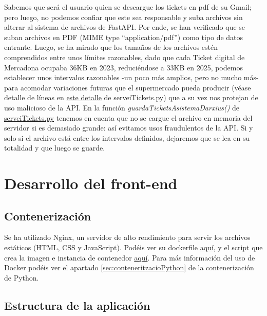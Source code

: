 \documentclass[a4paper,12pt]{report}
\begin{document}
	Sabemos que será el usuario quien se descargue los tickets en pdf de su Gmail; pero luego, no podemos confiar que este sea responsable y suba archivos sin alterar al sistema de archivos de FastAPI. Por ende, se han verificado que se suban archivos en PDF (MIME type ``application/pdf'') como tipo de datos entrante. Luego, se ha mirado que los tamaños de los archivos estén comprendidos entre unos límites razonables, dado que cada Ticket digital de Mercadona ocupaba 36KB en 2023, reduciéndose a 33KB en 2025, podemos establecer unos intervalos razonables -un poco más amplios, pero no mucho más- para acomodar variaciones futuras que el supermercado pueda producir (véase detalle de líneas en \href{https://github.com/blackcub3s/mercApp/blob/23594665639485c1bf9b7ba7e1904fe9785cf5ae/APP%20WEB/__FastAPI__/app/serveiTickets.py#L84-L85}{este detalle} de serveiTickets.py) que a su vez nos protejan de uso malicioso de la API. En la función \textit{guardaTicketsAsistemaDarxius()} de  \href{https://github.com/blackcub3s/mercApp/blob/main/APP%20WEB/__FastAPI__/app/serveiTickets.py}{serveiTickets.py} tenemos en cuenta que no se cargue el archivo en memoria del servidor si es demasiado grande: así evitamos usos fraudulentos de la API. Si y solo si el archivo está entre los intervalos definidos, dejaremos que se lea en su totalidad y que luego se guarde.
	
	
	
	\section{Desarrollo del front-end}
	
	\subsection{Contenerización}
	\label{sec:conteneritzacioNginx}
	
	Se ha utilizado Nginx, un servidor de alto rendimiento para servir los archivos estáticos (HTML, CSS y JavaScript). Podéis ver su dockerfile \href{https://github.com/blackcub3s/mercApp/blob/main/APP%20WEB/__frontend__produccio__/Dockerfile}{aquí}, y el script que crea la imagen e instancia de contenedor \href{https://github.com/blackcub3s/mercApp/blob/main/APP%20WEB/__frontend__produccio__/creaImatge_i_arrancaContenidor.sh}{aquí}. Para más información del uso de Docker podéis ver el apartado \ref{sec:conteneritzacioPython} de la contenerización de Python.
	
	\subsection{Estructura de la aplicación}
	\label{sec:estructuraAplicacionFrontEnd}
	
\end{document}
